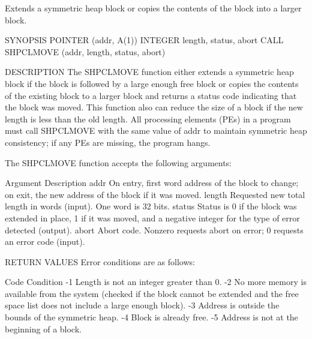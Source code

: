        Extends  a symmetric heap block or copies the contents of
       the block into a larger block.

SYNOPSIS
       POINTER (addr, A(1))
       INTEGER length, status, abort
       CALL SHPCLMOVE (addr, length, status, abort)

DESCRIPTION
       The SHPCLMOVE function either extends a symmetric  heap	block  if  the
       block  is  followed by a large enough free block or copies the contents
       of the existing block to a larger  block	 and  returns  a  status  code
       indicating that the block was moved.  This function also can reduce the
       size of a block if the new length is less than  the  old	 length.   All
       processing  elements  (PEs)  in	a program must call SHPCLMOVE with the
       same value of addr to maintain symmetric heap consistency; if  any  PEs
       are missing, the program hangs.

       The SHPCLMOVE function accepts the following arguments:

       Argument	      Description
       addr	      On  entry, first word address of the block to change; on
		      exit, the new address of the block if it was moved.
       length	      Requested new total length in words (input).   One  word
		      is 32 bits.
       status	      Status  is 0 if the block was extended in place, 1 if it
		      was moved, and a negative integer for the type of	 error
		      detected (output).
       abort	      Abort code.  Nonzero requests abort on error; 0 requests
		      an error code (input).

RETURN VALUES
       Error conditions are as follows:

       Code	      Condition
       -1	      Length is not an integer greater than 0.
       -2	      No more memory is available from the system (checked  if
		      the  block  cannot  be  extended and the free space list
		      does not include a large enough block).
       -3	      Address is outside the bounds of the symmetric heap.
       -4	      Block is already free.
       -5	      Address is not at the beginning of a block.

